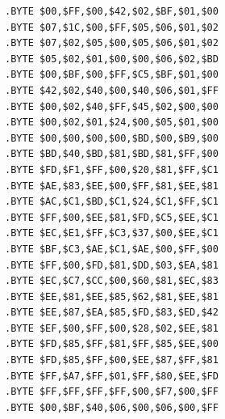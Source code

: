 \begin{minipage}[b]{0.33\linewidth}
\begin{lrbox}{\mybox}
\begin{lstlisting}[basicstyle=\ttfamily\tiny,escapechar=\%]
.BYTE $00,$FF,$00,$42,$02,$BF,$01,$00
.BYTE $07,$1C,$00,$FF,$05,$06,$01,$02
.BYTE $07,$02,$05,$00,$05,$06,$01,$02
.BYTE $05,$02,$01,$00,$00,$06,$02,$BD
.BYTE $00,$BF,$00,$FF,$C5,$BF,$01,$00
.BYTE $42,$02,$40,$00,$40,$06,$01,$FF
.BYTE $00,$02,$40,$FF,$45,$02,$00,$00
.BYTE $00,$02,$01,$24,$00,$05,$01,$00
.BYTE $00,$00,$00,$00,$BD,$00,$B9,$00
.BYTE $BD,$40,$BD,$81,$BD,$81,$FF,$00
.BYTE $FD,$F1,$FF,$00,$20,$81,$FF,$C1
.BYTE $AE,$83,$EE,$00,$FF,$81,$EE,$81
.BYTE $AC,$C1,$BD,$C1,$24,$C1,$FF,$C1
.BYTE $FF,$00,$EE,$81,$FD,$C5,$EE,$C1
.BYTE $EC,$E1,$FF,$C3,$37,$00,$EE,$C1
.BYTE $BF,$C3,$AE,$C1,$AE,$00,$FF,$00
.BYTE $FF,$00,$FD,$81,$DD,$03,$EA,$81
.BYTE $EC,$C7,$CC,$00,$60,$81,$EC,$83
.BYTE $EE,$81,$EE,$85,$62,$81,$EE,$81
.BYTE $EE,$87,$EA,$85,$FD,$83,$ED,$42
.BYTE $EF,$00,$FF,$00,$28,$02,$EE,$81
.BYTE $FD,$85,$FF,$81,$FF,$85,$EE,$00
.BYTE $FD,$85,$FF,$00,$EE,$87,$FF,$81
.BYTE $FF,$A7,$FF,$01,$FF,$80,$EE,$FD
.BYTE $FF,$FF,$FF,$FF,$00,$F7,$00,$FF
.BYTE $00,$BF,$40,$06,$00,$06,$00,$FF
\end{lstlisting}
\end{lrbox}%
\scalebox{0.8}{\usebox{\mybox}}
\end{minipage}
